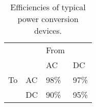 \begin{table}
\centering
\caption{Efficiencies of typical power conversion devices.}
\label{tab:conv_eff}
\begin{tabular}{|ll|l|l|}
\hline
	&				& \multicolumn{1}{l}{From}	&				\\ \cline{3-4} 
	&				& AC				& DC				\\ \hline 
To	& \multicolumn{1}{|l|}{AC}	& 98\% \cite{Starke2008}	& 97\% \cite{Starke2008}	\\ \cline{2-4} 
	& \multicolumn{1}{|l|}{DC}	& 90\% \cite{Pang2006}		& 95\% \cite{Starke2008}	\\ \hline
\end{tabular}
\end{table}
